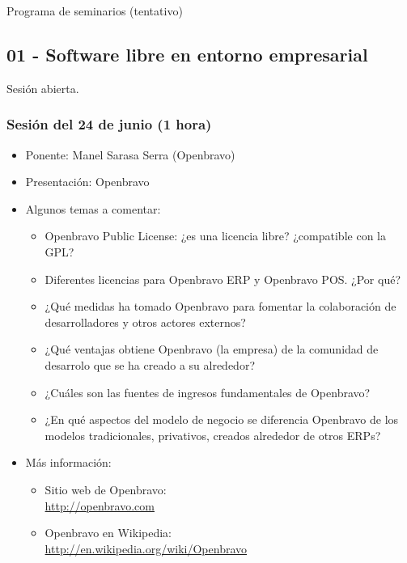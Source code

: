 \documentclass[a4paper,12pt]{article}
\begin{document}
Programa de seminarios (tentativo)

\subsection{01 - Software libre en entorno empresarial}

Sesión abierta.

\subsubsection{Sesión del 24 de junio (1 hora)}

\begin{itemize}
\item Ponente: Manel Sarasa Serra (Openbravo)
\item Presentación: Openbravo
\item Algunos temas a comentar: 
  \begin{itemize}
  \item Openbravo Public License: ¿es una licencia libre? ¿compatible con la GPL?
  \item Diferentes licencias para Openbravo ERP y Openbravo POS. ¿Por qué?
  \item ¿Qué medidas ha tomado Openbravo para fomentar la colaboración de desarrolladores y otros actores externos?
  \item ¿Qué ventajas obtiene Openbravo (la empresa) de la comunidad de desarrolo que se ha creado a su alrededor?
  \item ¿Cuáles son las fuentes de ingresos fundamentales de Openbravo?
  \item ¿En qué aspectos del modelo de negocio se diferencia Openbravo de los modelos tradicionales, privativos, creados alrededor de otros ERPs?
  \end{itemize}
\item Más información:
  \begin{itemize}
  \item Sitio web de Openbravo: \\
    \url{http://openbravo.com}
  \item Openbravo en Wikipedia: \\
    \url{http://en.wikipedia.org/wiki/Openbravo}
  \end{itemize}
\end{itemize}
\end{document}
